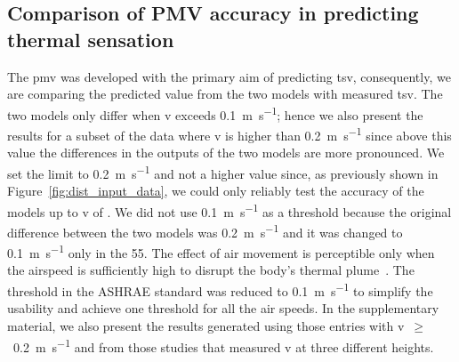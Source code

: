 \subsection{Comparison of PMV accuracy in predicting thermal sensation}\label{subsec:model-accuracy-comparison-in-predicting-thermal-sensation}
The \ac{pmv} was developed with the primary aim of predicting \ac{tsv}, consequently, we are comparing the predicted value from the two models with measured \ac{tsv}.
The two models only differ when \ac{v} exceeds \qty{0.1}{\m\per\s};
hence we also present the results for a subset of the data where \ac{v} is higher than \qty{0.2}{\m\per\s} since above this value the differences in the outputs of the two models are more pronounced.
We set the limit to \qty{0.2}{\m\per\s} and not a higher value since, as previously shown in Figure~\ref{fig:dist_input_data}, we could only reliably test the accuracy of the models up to \ac{v} of .
We did not use \qty{0.1}{\m\per\s} as a threshold because the original difference between the two models was \qty{0.2}{\m\per\s} and it was changed to \qty{0.1}{\m\per\s} only in the \gls{55}.
The effect of air movement is perceptible only when the airspeed is sufficiently high to disrupt the body's thermal plume~\cite{zukowska_impact_2012}.
The threshold in the ASHRAE standard was reduced to \qty{0.1}{\m\per\s} to simplify the usability and achieve one threshold for all the air speeds.
In the supplementary material, we also present the results generated using those entries with \ac{v}~$\geq$~\qty{0.2}{\m\per\s} and from those studies that measured \ac{v} at three different heights.

